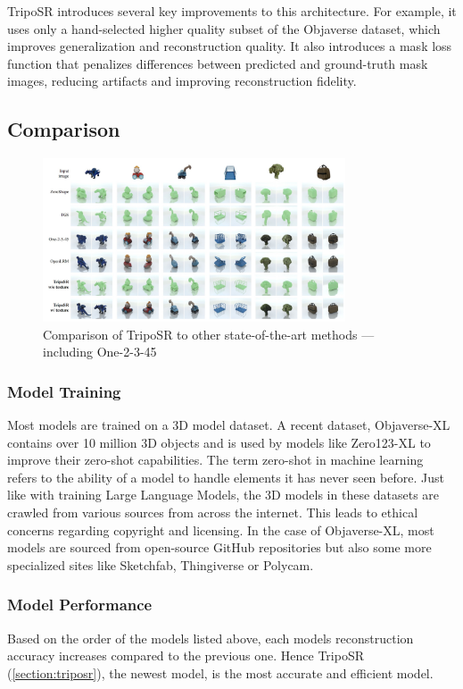 TripoSR introduces several key improvements to this architecture. For example, it uses only a hand-selected higher quality subset of the Objaverse dataset, which improves generalization and reconstruction quality. It also introduces a mask loss function that penalizes differences between predicted and ground-truth mask images, reducing artifacts and improving reconstruction fidelity.

\subsection{Comparison}

\begin{figure}
    \centering
    \includegraphics[width=0.8\textwidth]{images/comparison_tripo.jpg}
    \caption{Comparison of TripoSR to other state-of-the-art methods — including One-2-3-45 \autocite{tochilkin_triposr_2024}}
    \label{fig:comparison-tripo}
\end{figure}

\subsubsection{Model Training}
Most models are trained on a 3D model dataset. A recent dataset, Objaverse-XL \autocite{deitke_objaverse-xl_2023} contains over 10 million 3D objects and is used by models like Zero123-XL to improve their zero-shot capabilities.
The term zero-shot in machine learning refers to the ability of a model to handle elements it has never seen before.
Just like with training Large Language Models, the 3D models in these datasets are crawled from various sources from across the internet.
This leads to ethical concerns regarding copyright and licensing.
In the case of Objaverse-XL, most models are sourced from open-source GitHub repositories but also some more specialized sites like Sketchfab, Thingiverse or Polycam.

\subsubsection{Model Performance}
Based on the order of the models listed above, each models reconstruction accuracy increases compared to the previous one.
Hence TripoSR (\ref{section:triposr}), the newest model, is the most accurate and efficient model.

